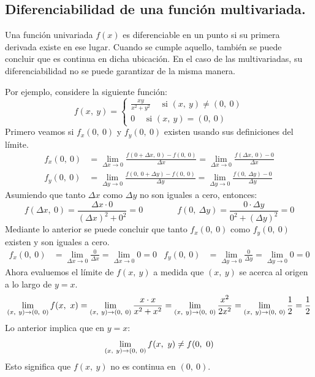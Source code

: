 \documentclass[12pt]{article}
\begin{document}
\subsection{Diferenciabilidad de una función multivariada.}

Una función univariada $f(x)$ es diferenciable en un punto si su primera derivada existe en ese lugar. Cuando se cumple aquello, también se puede concluir que es continua en dicha ubicación. En el caso de las multivariadas, su diferenciabilidad no se puede garantizar de la misma manera.

Por ejemplo, considere la siguiente función:
\[
f(x, \ y) =
\left\{
\begin{aligned}
  \frac{xy}{x^{2} + y^{2}} \quad \text{ si } (x, \ y) \neq (0, \ 0) \\
  0 \quad \text{ si } (x, \ y) = (0, \ 0)
\end{aligned}
\right.
\]
Primero veamos si $f_{x}(0, \ 0)$ y $f_{y}(0, \ 0)$ existen usando sus definiciones del límite.
\begin{align*}
  f_{x}(0, \ 0) &= \lim_{\Delta x \to 0} \frac{f(0 + \Delta x, \ 0) - f(0, \ 0)}{\Delta x}
                 = \lim_{\Delta x \to 0} \frac{f(\Delta x, \ 0) - 0}{\Delta x} \\
  f_{y}(0, \ 0) &= \lim_{\Delta y \to 0} \frac{f(0, \ 0 + \Delta y) - f(0, \ 0)}{\Delta y}
                 = \lim_{\Delta y \to 0} \frac{f(0, \ \Delta y) - 0}{\Delta y}
\end{align*}
Asumiendo que tanto $\Delta x$ como $\Delta y$ no son iguales a cero, entonces:
\[
  f(\Delta x, \ 0) = \frac{\Delta x \cdot 0}{(\Delta x)^{2} + 0^{2}} = 0 \qquad \qquad
  f(0, \ \Delta y) = \frac{0 \cdot \Delta y}{0^{2} + (\Delta y)^{2}} = 0
\]
Mediante lo anterior se puede concluir que tanto $f_{x}(0, \ 0)$ como $f_{y}(0, \ 0)$ existen y son iguales a cero.
\begin{align*}
  f_{x}(0, \ 0) &= \lim_{\Delta x \to 0} \frac{0}{\Delta x} = \lim_{\Delta x \to 0} 0 = 0 &
  f_{y}(0, \ 0) &= \lim_{\Delta y \to 0} \frac{0}{\Delta y} = \lim_{\Delta y \to 0} 0 = 0
\end{align*}
Ahora evaluemos el límite de $f(x, \ y)$ a medida que $(x, \ y)$ se acerca al origen a lo largo de $y = x$.
\[
\lim_{(x, \ y) \to (0, \ 0)} f(x, \ x) = \lim_{(x, \ y) \to (0, \ 0)} \frac{x \cdot x}{x^{2} + x^{2}}
                          = \lim_{(x, \ y) \to (0, \ 0)} \frac{x^{2}}{2x^{2}}
                          = \lim_{(x, \ y) \to (0, \ 0)} \frac{1}{2}
                          = \frac{1}{2}
\]
Lo anterior implica que en $y = x$:
\[
  \limbiv{0, \ 0} f(x, \ y) \neq f(0, \ 0)
\]
Esto significa que $f(x, \ y)$ no es continua en $(0, \ 0)$.
\end{document}
